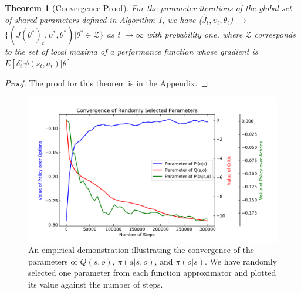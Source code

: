 \documentclass[letterpaper]{article} %
\newtheorem{theorem}{Theorem}
\begin{document}
\begin{theorem}[Convergence Proof]
\label{conv}
For the parameter iterations of the global set of shared parameters defined in Algorithm 1, we have ($\hat{J}_{t}, \upsilon_{t}, \theta_{t} $) $\to$ $\{(J(\theta^{*})_{t}, \upsilon^{*}, \theta^{*} )|\theta^{*} \in \mathcal{Z}\}$ as t $\to \infty$ with probability one, where $\mathcal{Z}$ corresponds to the set of local maxima of a performance function whose gradient is $E[\delta^{\pi}_{t}\psi(s_{t},a_{t})|\theta]$
\end{theorem}


\begin{proof}
The proof for this theorem is in the Appendix.
\end{proof}

\begin{figure}[t]
\centering
\includegraphics[width=0.9\columnwidth]{MultiPlot.png} %
\caption{An empirical demonstration illustrating the convergence of the parameters of $Q(s,o)$, $\pi(a|s,o)$, and $\pi(o|s)$. We have randomly selected one parameter from each function approximator and plotted its value against the number of steps.}
\label{fig2}
\end{figure}
\end{document}
